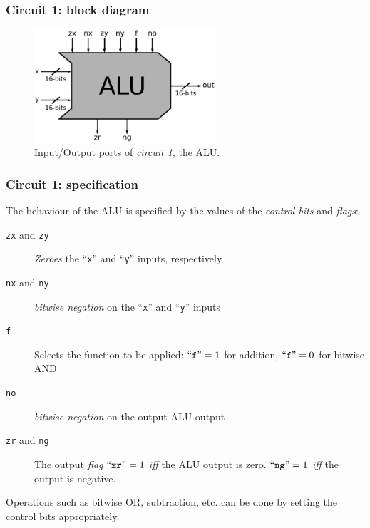 \documentclass{beamer}
\begin{document}
            \begin{frame}
                \frametitle{Circuit 1: block diagram}

                \begin{figure}[h!]
                    \centerline{\includegraphics[width=0.6\textwidth]{imgs/alu-block.pdf}}
                    \caption{Input/Output ports of \emph{circuit 1}, the ALU.
                        \label{fig:alu-block}}
                \end{figure}
            \end{frame}

            \begin{frame}
                \frametitle{Circuit 1: specification}

                \par{The behaviour of the ALU is specified by the values of the \emph{control bits} and \emph{flags}:}

                \begin{description}
                    \item[\texttt{zx} and \texttt{zy}]
                        \emph{Zeroes} the ``\texttt{x}'' and ``\texttt{y}'' inputs, respectively
                    \item[\texttt{nx} and \texttt{ny}]
                        \emph{bitwise negation} on the ``\texttt{x}'' and ``\texttt{y}'' inputs
                    \item[\texttt{f}]
                        Selects the function to be applied: \newline
                        $\text{``\texttt{f}''} = 1$ for addition, $\text{``\texttt{f}''} = 0$ for bitwise AND
                    \item[\texttt{no}]
                        \emph{bitwise negation} on the output ALU output
                    \item[\texttt{zr} and \texttt{ng}]
                        The output \emph{flag} $\text{``\texttt{zr}''} = 1$ \emph{iff} the ALU output is zero.
                        $\text{``\texttt{ng}''} = 1$ \emph{iff} the output is negative.
                \end{description}

                \par{Operations such as bitwise OR, subtraction, etc. can be done by setting the control bits appropriately.}
            \end{frame}
\end{document}
